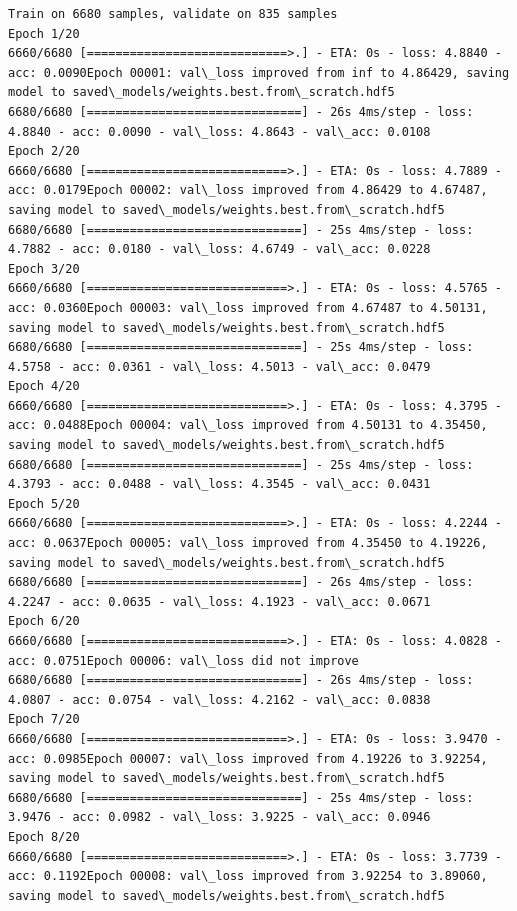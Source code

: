 \documentclass[11pt]{article}
\begin{document}
    \begin{Verbatim}[commandchars=\\\{\}]
Train on 6680 samples, validate on 835 samples
Epoch 1/20
6660/6680 [============================>.] - ETA: 0s - loss: 4.8840 - acc: 0.0090Epoch 00001: val\_loss improved from inf to 4.86429, saving model to saved\_models/weights.best.from\_scratch.hdf5
6680/6680 [==============================] - 26s 4ms/step - loss: 4.8840 - acc: 0.0090 - val\_loss: 4.8643 - val\_acc: 0.0108
Epoch 2/20
6660/6680 [============================>.] - ETA: 0s - loss: 4.7889 - acc: 0.0179Epoch 00002: val\_loss improved from 4.86429 to 4.67487, saving model to saved\_models/weights.best.from\_scratch.hdf5
6680/6680 [==============================] - 25s 4ms/step - loss: 4.7882 - acc: 0.0180 - val\_loss: 4.6749 - val\_acc: 0.0228
Epoch 3/20
6660/6680 [============================>.] - ETA: 0s - loss: 4.5765 - acc: 0.0360Epoch 00003: val\_loss improved from 4.67487 to 4.50131, saving model to saved\_models/weights.best.from\_scratch.hdf5
6680/6680 [==============================] - 25s 4ms/step - loss: 4.5758 - acc: 0.0361 - val\_loss: 4.5013 - val\_acc: 0.0479
Epoch 4/20
6660/6680 [============================>.] - ETA: 0s - loss: 4.3795 - acc: 0.0488Epoch 00004: val\_loss improved from 4.50131 to 4.35450, saving model to saved\_models/weights.best.from\_scratch.hdf5
6680/6680 [==============================] - 25s 4ms/step - loss: 4.3793 - acc: 0.0488 - val\_loss: 4.3545 - val\_acc: 0.0431
Epoch 5/20
6660/6680 [============================>.] - ETA: 0s - loss: 4.2244 - acc: 0.0637Epoch 00005: val\_loss improved from 4.35450 to 4.19226, saving model to saved\_models/weights.best.from\_scratch.hdf5
6680/6680 [==============================] - 26s 4ms/step - loss: 4.2247 - acc: 0.0635 - val\_loss: 4.1923 - val\_acc: 0.0671
Epoch 6/20
6660/6680 [============================>.] - ETA: 0s - loss: 4.0828 - acc: 0.0751Epoch 00006: val\_loss did not improve
6680/6680 [==============================] - 26s 4ms/step - loss: 4.0807 - acc: 0.0754 - val\_loss: 4.2162 - val\_acc: 0.0838
Epoch 7/20
6660/6680 [============================>.] - ETA: 0s - loss: 3.9470 - acc: 0.0985Epoch 00007: val\_loss improved from 4.19226 to 3.92254, saving model to saved\_models/weights.best.from\_scratch.hdf5
6680/6680 [==============================] - 25s 4ms/step - loss: 3.9476 - acc: 0.0982 - val\_loss: 3.9225 - val\_acc: 0.0946
Epoch 8/20
6660/6680 [============================>.] - ETA: 0s - loss: 3.7739 - acc: 0.1192Epoch 00008: val\_loss improved from 3.92254 to 3.89060, saving model to saved\_models/weights.best.from\_scratch.hdf5

\end{Verbatim}
\end{document}
